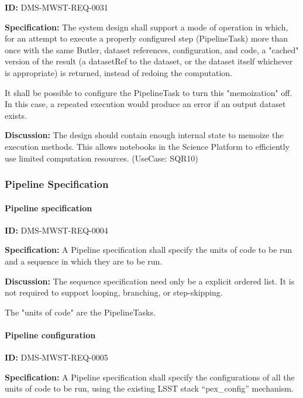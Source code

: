 \documentclass[SE,toc,lsstdraft]{lsstdoc}
\begin{document}
\label{DMS-MWST-REQ-0031}
\textbf{ID:} DMS-MWST-REQ-0031

\textbf{Specification:}
The system design shall support a mode of operation in which, for an attempt to execute a properly configured step (PipelineTask) more than once with the same Butler, dataset references, configuration, and code, a "cached" version of the result (a datasetRef to the dataset, or the dataset itself whichever is appropriate) is returned, instead of redoing the computation.

It shall be possible to configure the PipelineTask to turn this "memoization" off. In this case, a repeated execution would produce an error if an output dataset exists.

\textbf{Discussion:}
The design should contain enough internal state to memoize the execution methods. This allows notebooks in the Science Platform to efficiently use limited computation resources. (UseCase: SQR10)

\subsubsection{Pipeline Specification}

\paragraph{Pipeline specification}\hfill  %

\label{DMS-MWST-REQ-0004}
\textbf{ID:} DMS-MWST-REQ-0004

\textbf{Specification:}
A Pipeline specification shall specify the units of code to be run and a sequence in which they are to be run.

\textbf{Discussion:}
The sequence specification need only be a explicit ordered list.  It is not required to support looping, branching, or step-skipping.

The "units of code" are the PipelineTasks.

\paragraph{Pipeline configuration}\hfill  %

\label{DMS-MWST-REQ-0005}
\textbf{ID:} DMS-MWST-REQ-0005

\textbf{Specification:}
A Pipeline specification shall specify the configurations of all the units of code to be run, using the existing LSST stack “pex\_config” mechanism.
\end{document}
